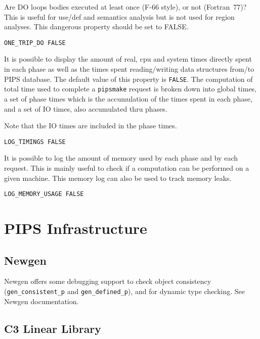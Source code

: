 Are DO loops bodies executed at least once (F-66 style), or not (Fortran~77)?
This is useful for use/def and semantics analysis but is not used for
region analyses. This dangerous property should be set to FALSE.

\begin{verbatim}
ONE_TRIP_DO FALSE
\end{verbatim}

It is possible to display the amount of real, cpu and system times
directly spent in each phase as well as the times spent reading/writing data
structures from/to PIPS database. The default value of this property is
\verb+FALSE+. The computation of total time used to complete a
\verb+pipsmake+ request is broken down into global times, a set of phase times
which is the accumulation of the times spent in each phase, and a set of
IO times, also accumulated thru phases. 

Note that the IO times are included in the phase times.

\begin{verbatim}
LOG_TIMINGS FALSE
\end{verbatim}

It is possible to log the amount of memory used by each phase and by
each request. This is mainly useful to check if a computation can be
performed on a given machine. This memory log can also be used to track memory
leaks.

\begin{verbatim}
LOG_MEMORY_USAGE FALSE
\end{verbatim}




\section{PIPS Infrastructure}
\label{section-pips-infrastructure}

\subsection{Newgen}

Newgen offers some debugging support to check object consistency
(\verb+gen_consistent_p+ and \verb+gen_defined_p+), and for dynamic type
checking. See Newgen documentation\cite{JT89}\cite{JT90}.

\subsection{C3 Linear Library}

